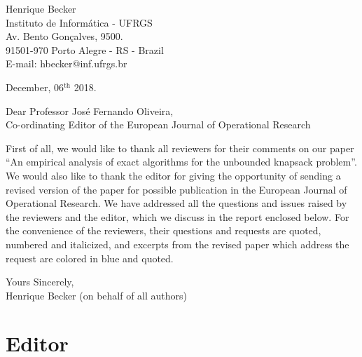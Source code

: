 \documentclass{elsarticle}
\begin{document}
\pagestyle{empty}

\vspace{2cm}

\begin{flushright}
   \begin{minipage}{7cm}
      Henrique Becker \\
      Instituto de Informática - UFRGS \\
      Av. Bento Gonçalves, 9500. \\
      91501-970 Porto Alegre - RS - Brazil \\
      E-mail: hbecker@inf.ufrgs.br \\
   \end{minipage}
\end{flushright}

\begin{flushleft}
December, 06$^{\text{th}}$ 2018.

\vspace{1.5cm}

Dear Professor José Fernando Oliveira, \\
Co-ordinating Editor of the European Journal of Operational Research
\end{flushleft}

\bigskip
First of all, we would like to thank all reviewers for their comments on our paper ``An empirical analysis of exact algorithms for the unbounded knapsack problem''.
We would also like to thank the editor for giving the opportunity of sending a revised version of the paper for possible publication in the European Journal of Operational Research.
We have addressed all the questions and issues raised by the reviewers and the editor, which we discuss in the report enclosed below.
For the convenience of the reviewers, their questions and requests are quoted, numbered and italicized, and excerpts from the revised paper which address the request are colored in blue and quoted.

\bigskip

\begin{flushleft}
Yours Sincerely,\\
Henrique Becker (on behalf of all authors)
\end{flushleft}

\newpage

\section{Editor}
\end{document}
